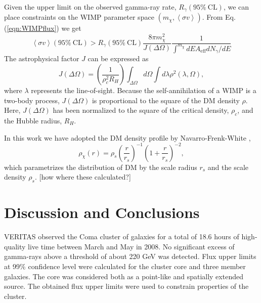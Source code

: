 \documentclass[12pt,manuscript]{aastex}
\newcommand{\expval}[1]{\left\langle #1 \right\rangle}
\begin{document}
Given the upper limit on the observed gamma-ray rate, $R_{\gamma}(95\%\ \mathrm{CL})$, we can place
constraints on the WIMP parameter space $(m_{\chi}, \expval{\sigma v})$. From Eq.
(\ref{eqn:WIMPflux}) we get
\begin{equation}
\expval{\sigma v}(95\%\ \mathrm{CL}) > 
R_{\gamma}(95\%\ \mathrm{CL}) \frac{8\pi m_{\chi}^{2}}{J(\Delta\Omega)}
\frac{1}{\int^{m_{\chi}} dE A_{\mathrm{eff}}dN_{\gamma}/dE}
\end{equation}
The astrophysical factor $J$ can be expressed as
\begin{equation}
J(\Delta\Omega)=\left(\frac{1}{\rho_{c}^{2}R_{H}}\right)
\int_{\Delta\Omega}d\Omega\int d\lambda \rho^{2}(\lambda,\Omega),
\end{equation}
where $\lambda$ represents the line-of-sight. Because the self-annihilation of a WIMP is a two-body
process, $J(\Delta\Omega)$ is proportional to the square of the DM density $\rho$. Here,
$J(\Delta\Omega)$ has been normalized to the square of the critical density, $\rho_{c}$, and the
Hubble radius, $R_{H}$. 

In this work we have adopted the DM density profile by Navarro-Frenk-White
\citep[NFW;][]{article:NavarroFrenkWhite:1997},
\begin{equation}
\rho_{\chi}(r)=\rho_{s}\left(\frac{r}{r_{s}}\right)^{-1}\left(1+\frac{r}{r_{s}}\right)^{-2},
\end{equation} 
which parametrizes the distribution of DM by the scale radius $r_{s}$ and the scale density
$\rho_{s}$. [how where these calculated?]


%
%

\section{Discussion and Conclusions}
VERITAS observed the Coma cluster of galaxies for a total of 18.6 hours of high-quality live time
between March and May in 2008. No significant excess of gamma-rays above a threshold of about 220
GeV was detected. Flux upper limits at 99\% confidence level were calculated for the cluster core
and three member galaxies. The core was considered both as a point-like and spatially extended
source. The obtained flux upper limits were used to constrain properties of the cluster.
\end{document}
